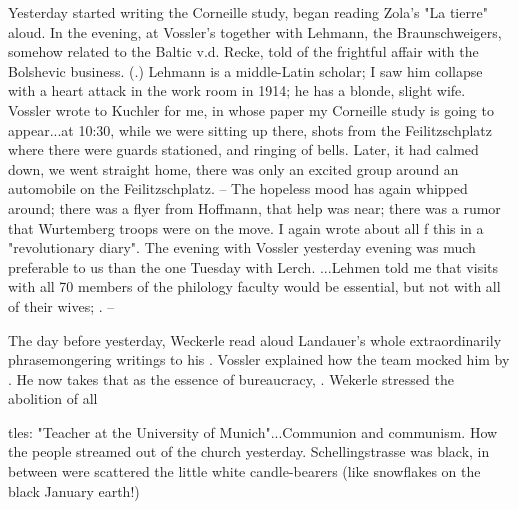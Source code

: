 
Yesterday started writing the Corneille study, began reading Zola's "La tierre" aloud. In the evening, at Vossler's together with Lehmann, the Braunschweigers, somehow related to the Baltic v.d. Recke, told of the frightful affair with the Bolshevic business. (.) Lehmann is a middle-Latin scholar; I saw him collapse with a heart attack in the work room in 1914; he has a blonde, slight wife. Vossler wrote to Kuchler for me, in whose paper my Corneille study is going to appear...at 10:30, while we were sitting up there, shots from the Feilitzschplatz where there were guards stationed, and ringing of bells. Later, it had calmed down, we went straight home, there was only an excited group around an automobile on the Feilitzschplatz. -- The hopeless mood has again whipped around; there was a flyer from Hoffmann, that help was near; there was a rumor that Wurtemberg troops were on the move. I again wrote about all 
f this in a "revolutionary diary". The evening with Vossler yesterday evening was much preferable to us than the one Tuesday with Lerch. ...Lehmen told me that visits with all 70 members of the philology faculty would be essential, but not with all of their wives; . --

The day before yesterday, Weckerle read aloud Landauer's whole extraordinarily phrasemongering writings to his . Vossler explained how the team mocked him by . He now takes that as the essence of bureaucracy, . Wekerle stressed the abolition of all 

tles: "Teacher at the University of Munich"...Communion and communism. How the people streamed out of the church yesterday. Schellingstrasse was black, in between were scattered the little white candle-bearers (like snowflakes on the black January earth!)%